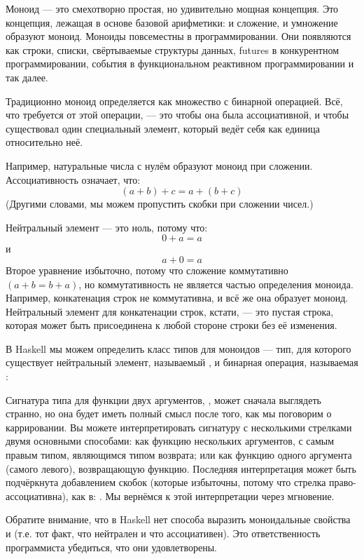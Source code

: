 Моноид --- это смехотворно простая, но удивительно мощная концепция. Это
концепция, лежащая в основе базовой арифметики: и сложение, и умножение
образуют моноид. Моноиды повсеместны в программировании. Они появляются как
строки, списки, свёртываемые структуры данных, futures в конкурентном
программировании, события в функциональном реактивном программировании и так далее.

Традиционно моноид определяется как множество с бинарной операцией. Всё,
что требуется от этой операции, --- это чтобы она была ассоциативной, и чтобы
существовал один специальный элемент, который ведёт себя как единица относительно
неё.

Например, натуральные числа с нулём образуют моноид при сложении.
Ассоциативность означает, что:
\[(a + b) + c = a + (b + c)\]
(Другими словами, мы можем пропустить скобки при сложении чисел.)

Нейтральный элемент --- это ноль, потому что:
\[0 + a = a\]
и
\[a + 0 = a\]
Второе уравнение избыточно, потому что сложение коммутативно $(a + b
  = b + a)$, но коммутативность не является частью определения моноида.
Например, конкатенация строк не коммутативна, и всё же она образует
моноид. Нейтральный элемент для конкатенации строк, кстати, --- это
пустая строка, которая может быть присоединена к любой стороне строки без
её изменения.

В Haskell мы можем определить класс типов для моноидов --- тип, для которого
существует нейтральный элемент, называемый , и бинарная операция,
называемая :

Сигнатура типа для функции двух аргументов,
, может сначала выглядеть странно,
но она будет иметь полный смысл после того, как мы поговорим о каррировании. Вы можете
интерпретировать сигнатуру с несколькими стрелками двумя основными способами: как
функцию нескольких аргументов, с самым правым типом, являющимся типом возврата;
или как функцию одного аргумента (самого левого), возвращающую
функцию. Последняя интерпретация может быть подчёркнута добавлением
скобок (которые избыточны, потому что стрелка
право-ассоциативна), как в: .
Мы вернёмся к этой интерпретации через мгновение.

Обратите внимание, что в Haskell нет способа выразить моноидальные
свойства  и  (т.е. тот факт, что
 нейтрален и что  ассоциативен).
Это ответственность программиста убедиться, что они
удовлетворены.

